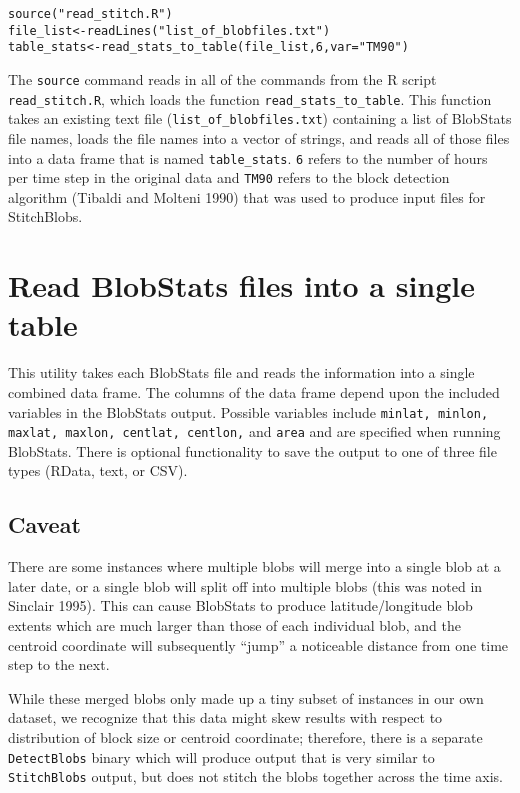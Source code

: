 \documentclass{article}
\begin{document}
\begin{verbatim}
source("read_stitch.R")
file_list<-readLines("list_of_blobfiles.txt")
table_stats<-read_stats_to_table(file_list,6,var="TM90")
\end{verbatim}

The \texttt{source} command reads in all of the commands from the R script \texttt{read\_stitch.R}, which loads the function \texttt{read\_stats\_to\_table}. This function takes an existing text file (\texttt{list\_of\_blobfiles.txt}) containing a list of BlobStats file names, loads the file names into a vector of strings, and reads all of those files into a data frame that is named \texttt{table\_stats}. \texttt{6} refers to the number of hours per time step in the original data and \texttt{TM90} refers to the block detection algorithm (Tibaldi and Molteni 1990) that was used to produce input files for StitchBlobs. 

\section{Read BlobStats files into a single table}\label{readtable}
This utility takes each BlobStats file and reads the information into a single combined data frame. The columns of the data frame depend upon the included variables in the BlobStats output. Possible variables include \texttt{minlat, minlon, maxlat, maxlon, centlat, centlon,} and \texttt{area} and are specified when running BlobStats. There is optional functionality to save the output to one of three file types (RData, text, or CSV).

\subsection{Caveat}
There are some instances where multiple blobs will merge into a single blob at a later date, or a single blob will split off into multiple blobs (this was noted in Sinclair 1995). This can cause BlobStats to produce latitude/longitude blob extents which are much larger than those of each individual blob, and the centroid coordinate will subsequently ``jump'' a noticeable distance from one time step to the next. 

While these merged blobs only made up a tiny subset of instances in our own dataset, we recognize that this data might skew results with respect to distribution of block size or centroid coordinate; therefore, there is a separate \texttt{DetectBlobs} binary which will produce output that is very similar to \texttt{StitchBlobs} output, but does not stitch the blobs together across the time axis. 
\end{document}
